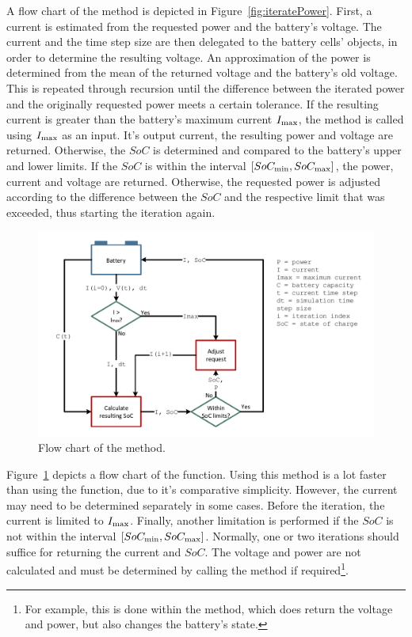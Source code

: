 A flow chart of the  method is depicted in Figure~\ref{fig:iteratePower}. First, a current is estimated from the requested power and the battery's voltage. The current and the time step size are then delegated to the battery cells'  objects, in order to determine the resulting voltage. An approximation of the power is determined from the mean of the returned voltage and the battery's old voltage. This is repeated through recursion until the difference between the iterated power and the originally requested power meets a certain tolerance. If the resulting current is greater than the battery's maximum current $I_\text{max}$, the  method is called using $I_\text{max}$ as an input. It's output current, the resulting power and voltage are returned. Otherwise, the $SoC$ is determined and compared to the battery's upper and lower limits. If the $SoC$ is within the interval $[SoC_\text{min}, SoC_\text{max}]$, the power, current and voltage are returned. Otherwise, the requested power is adjusted according to the difference between the $SoC$ and the respective limit that was exceeded, thus starting the iteration again. \\
\begin{figure}[t!]
	\captionsetup{type=figure}
	\centering
	\includegraphics[width=\textwidth]{iterateCurrent.pdf}
	\caption[Flow chart of the  method]{Flow chart of the  method.}
	\label{fig:iterateCurrent}
\end{figure}
Figure~\ref{fig:iterateCurrent} depicts a flow chart of the  function. Using this method is a lot faster than using the  function, due to it's comparative simplicity. However, the current may need to be determined separately in some cases. Before the iteration, the current is limited to $I_\text{max}$. Finally, another limitation is performed if the $SoC$ is not within the interval $[SoC_\text{min}, SoC_\text{max}]$. Normally, one or two iterations should suffice for returning the current and $SoC$. The voltage and power are not calculated and must be determined by calling the  method if required\footnote{For example, this is done within the  method, which does return the voltage and power, but also changes the battery's state.}.\\
